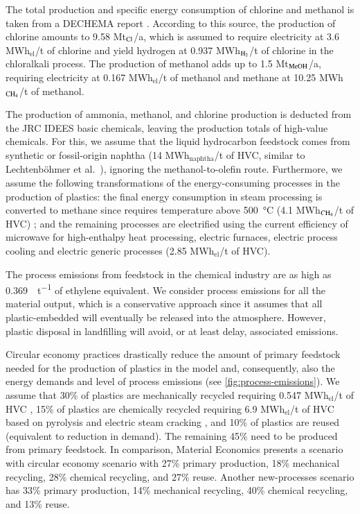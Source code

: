The total production and specific energy consumption of chlorine and methanol is
taken from a DECHEMA report . According to this
source, the production of chlorine amounts to 9.58 Mt$_{\ce{Cl}}$/a, which is assumed
to require electricity at 3.6 MWh$_{\text{el}}$/t of chlorine and yield hydrogen at
0.937 MWh$_{\ce{H2}}$/t of chlorine in the chloralkali process. The production of
methanol adds up to 1.5 Mt$_{\ce{MeOH}}$/a, requiring electricity at 0.167 MWh$_{\text{el}}$/t
of methanol and methane at 10.25 MWh$_{\ce{CH4}}$/t of methanol.

The production of ammonia, methanol, and chlorine production is deducted from
the JRC IDEES basic chemicals, leaving the production totals of high-value
chemicals. For this, we assume that the liquid hydrocarbon feedstock comes from
synthetic or fossil-origin naphtha (14 MWh$_{\text{naphtha}}$/t of HVC, similar
to Lechtenböhmer et al.~), ignoring
the methanol-to-olefin route. Furthermore, we assume the following
transformations of the energy-consuming processes in the production of plastics:
the final energy consumption in steam processing is converted to methane since
requires temperature above \SI{500}{\celsius} (4.1 MWh$_{\ce{CH4}}$/t of
HVC) ; and the remaining processes are
electrified using the current efficiency of microwave for high-enthalpy heat
processing, electric furnaces, electric process cooling and electric generic
processes (2.85 MWh$_{\text{el}}$/t of HVC).

The process emissions from feedstock in the chemical industry are as high as
\SI{0.369}{\tco\per\tonne} of ethylene equivalent. We consider process emissions
for all the material output, which is a conservative approach since it assumes
that all plastic-embedded \co will eventually be released into the atmosphere.
However, plastic disposal in landfilling will avoid, or at least delay,
associated \co emissions.

Circular economy practices drastically reduce the amount of primary feedstock
needed for the production of plastics in the model
 and, consequently, also the energy demands
and level of process emissions  (see
\cref{fig:process-emissions}). We assume that 30\% of plastics are mechanically
recycled requiring 0.547 MWh$_{\text{el}}$/t of HVC
, 15\% of plastics are chemically recycled
requiring 6.9 MWh$_{\text{el}}$/t of HVC based on pyrolysis and electric steam
cracking , and 10\% of
plastics are reused (equivalent to reduction in demand). The remaining 45\% need
to be produced from primary feedstock. In comparison, Material Economics
 presents a scenario with circular economy scenario with
27\% primary production, 18\% mechanical recycling, 28\% chemical recycling, and
27\% reuse. Another new-processes scenario has 33\% primary production, 14\%
mechanical recycling, 40\% chemical recycling, and 13\% reuse.

